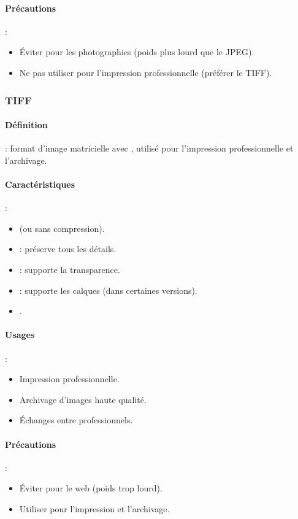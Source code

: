\paragraph{Précautions} :
\begin{itemize}
    \item Éviter pour les photographies (poids plus lourd que le JPEG).
    \item Ne pas utiliser pour l'impression professionnelle (préférer le TIFF).
\end{itemize}

\subsubsection{TIFF}

\paragraph{Définition} : format d'image matricielle avec , utilisé pour l'impression professionnelle et l'archivage.

\paragraph{Caractéristiques} :
\begin{itemize}
    \item {} (ou sans compression).
    \item {} : préserve tous les détails.
    \item {} : supporte la transparence.
    \item {} : supporte les calques (dans certaines versions).
    \item {}.
\end{itemize}

\paragraph{Usages} :
\begin{itemize}
    \item Impression professionnelle.
    \item Archivage d'images haute qualité.
    \item Échanges entre professionnels.
\end{itemize}

\paragraph{Précautions} :
\begin{itemize}
    \item Éviter pour le web (poids trop lourd).
    \item Utiliser pour l'impression et l'archivage.
\end{itemize}

